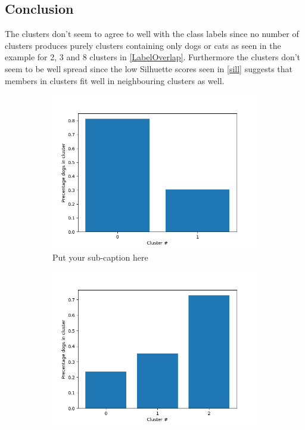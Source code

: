 \documentclass{article}
\begin{document}
\subsection{Conclusion}
The clusters don't seem to agree to well with the class labels since no number of clusters produces purely clusters containing only dogs or cats as seen in the example for 2, 3 and 8 clusters in \ref{LabelOverlap}. Furthermore the clusters don't seem to be well spread since the low Silhuette scores seen in \ref{sill} suggests that members in clusters fit well in neighbouring clusters as well. 
\begin{figure}[ht]
\begin{subfigure}{.33\textwidth}
  \centering
  \includegraphics[width=1\linewidth]{1c/label overlapp 2 clusters.png}  
  \caption{Put your sub-caption here}
  \label{fig:sub-first}
\end{subfigure}
\begin{subfigure}{.33\textwidth}
  \centering
  \includegraphics[width=1\linewidth]{1c/label overlapp 3 clusters.png}  

\end{subfigure}
\end{figure}
\end{document}
